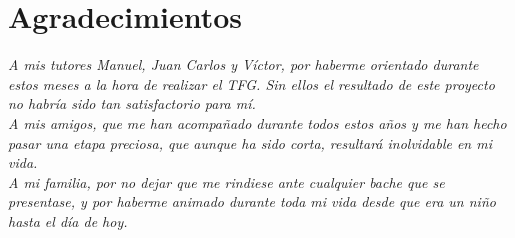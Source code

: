 \pagestyle{plain}
\chapter*{Agradecimientos}

{\it 
A mis tutores Manuel, Juan Carlos y Víctor, por haberme orientado durante estos meses a la hora de realizar el TFG. Sin ellos el resultado de este proyecto no habría sido tan satisfactorio para mí.
\\

A mis amigos, que me han acompañado durante todos estos años y me han hecho pasar una etapa preciosa, que aunque ha sido corta, resultará inolvidable en mi vida.
\\

A mi familia, por no dejar que me rindiese ante cualquier bache que se presentase, y por haberme animado durante toda mi vida desde que era un niño hasta el día de hoy.
}